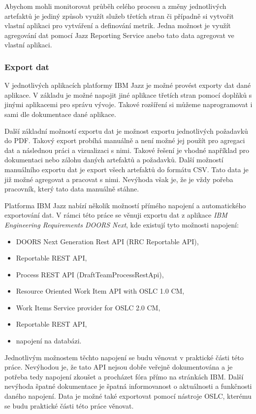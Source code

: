 \documentclass[czech,master,public,dept460,male,cpdeclaration,oneside]{diploma}
\begin{document}
Abychom mohli monitorovat průběh celého procesu a změny jednotlivých artefaktů je jediný způsob využít služeb třetích stran či případně si vytvořit vlastní aplikaci pro vytváření a definování metrik. Jedna možnost je využít agregování dat pomocí Jazz Reporting Service anebo tato data agregovat ve vlastní aplikaci.

\subsubsection{Export dat}
V jednotlivých aplikacích platformy IBM Jazz je možné provést exporty dat dané aplikace. V základu je možné napojit jiné aplikace třetích stran pomocí doplňků s jinými aplikacemi pro správu vývoje. Takové rozšíření si můžeme naprogramovat i sami dle dokumentace dané aplikace.

Další základní možností exportu dat je možnost exportu jednotlivých požadavků do PDF. Takový export probíhá manuálně a není možné jej použít pro agregaci dat a následnou práci a vizualizaci s nimi. Takové řešení je vhodné například pro dokumentaci nebo zálohu daných artefaktů a požadavků. Další možností manuálního exportu dat je export všech artefaktů do formátu CSV. Tato data je již možné agregovat a pracovat s nimi. Nevýhoda však je, že je vždy pořeba pracovník, který tato data manuálně stáhne.

Platforma IBM Jazz nabízí několik možností přímého napojení a automatického exportování dat. V rámci této práce se věnuji exportu dat z aplikace \textit{IBM Engineering Requirements DOORS Next}, kde existují tyto možnosti napojení:

\begin{itemize}
\item DOORS Next Generation Rest API (RRC Reportable API),
\item Reportable REST API,
\item Process REST API (DraftTeamProcessRestApi),
\item Resource Oriented Work Item API with OSLC 1.0 CM,
\item Work Items Service provider for OSLC 2.0 CM,
\item Reportable REST API,
\item napojení na databázi.
\end{itemize}

Jednotlivým možnostem těchto napojení se budu věnovat v praktické části této práce. Nevýhodou je, že tato API nejsou dobře veřejně dokumentována a je potřeba tedy napojení zkoušet a procházet fóra přímo na stránkách IBM. Další nevýhoda špatné dokumentace je špatná informovanost o aktuálnosti a funkčnosti daného napojení. Data je možné také exportovat pomocí nástroje OSLC, kterému se budu praktické části této práce věnovat.
\end{document}
